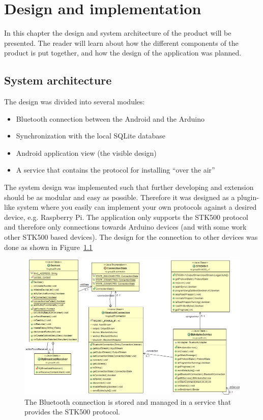 \chapter{Design and implementation}
In this chapter the design and system architecture of the product will be presented. The reader will learn about how the different components of the product is put together, and how the design of the application was planned.

\section{System architecture}
	The design was divided into several modules:
	\begin{itemize}
		\item{Bluetooth connection between the Android and the Arduino}
		\item{Synchronization with the local SQLite database}
		\item{Android application view (the visible design)}
		\item{A service that contains the protocol for installing ``over the air''}
	\end{itemize}
	\vspace{0.2in}
	
	The system design was implemented such that further developing and extension should be as modular and easy as possible.
	Therefore it was designed as a plugin-like system where you easily can implement your own protocols against a desired device, e.g. Raspberry Pi. The application only supports the STK500 protocol and therefore only connections towards Arduino devices (and with some work other STK500 based devices).
	The design for the connection to other devices was done as shown in Figure~\ref{fig:btconnection_service_stk500}\\

	\begin{figure}[H]
	\hspace*{-1.0in}
	\includegraphics[scale=0.55]{images/UML/btconnection_service_stk500.png}
	\caption[BT connection in service]{The Bluetooth connection is stored and managed in a service that provides the STK500 protocol.}
	\label{fig:btconnection_service_stk500}
	\end{figure}

